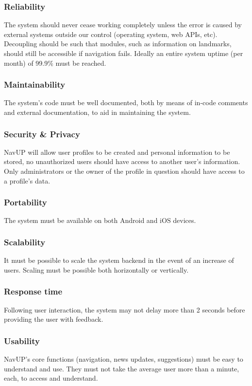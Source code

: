 \documentclass[12pt, a4paper]{article}
\begin{document}
		\subsubsection{Reliability} The system should never cease working completely unless the error is caused by external systems outside our control (operating system, web APIs, etc). Decoupling should be such that modules, such as information on landmarks, should still be accessible if navigation fails. Ideally an entire system uptime (per month) of 99.9\% must be reached.
		\subsubsection{Maintainability} The system's code must be well documented, both by means of in-code comments and external documentation, to aid in maintaining the system.
		\subsubsection{Security \& Privacy} NavUP will allow user profiles to be created and personal information to be stored, no unauthorized users should have access to another user's information. Only administrators or the owner of the profile in question should have access to a profile's data.
		\subsubsection{Portability} The system must be available on both Android and iOS devices.
		\subsubsection{Scalability} It must be possible to scale the system backend in the event of an increase of users. Scaling must be possible both horizontally or vertically.
		\subsubsection{Response time} Following user interaction, the system may not delay more than 2 seconds before providing the user with feedback.
		\subsubsection{Usability} NavUP's core functions (navigation, news updates, suggestions) must be easy to understand and use. They must not take the average user more than a minute, each, to access and understand. 
\end{document}
